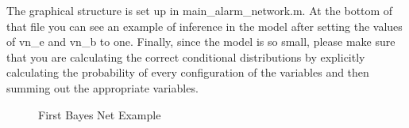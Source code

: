\documentclass[12pt]{article}
\begin{document}
{	 The graphical structure is set up in main\_alarm\_network.m.  At the bottom of that file you can see an example of inference in the model after setting the values of vn\_e and vn\_b to one.  Finally, since the model is so small, please make sure that you are calculating the correct conditional distributions by explicitly calculating the probability of every configuration of the variables and then summing out the appropriate variables.\\
	 \begin{figure}
		\begin{center}
			\caption{First Bayes Net Example}
			\label{bnexample}
		\end{center} 
	\end{figure} 
}
\end{document}

